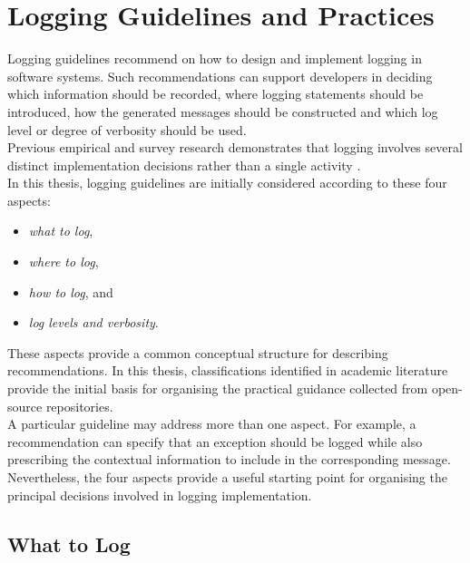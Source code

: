 \section{Logging Guidelines and Practices}
\label{sec:background_logging_guidelines}

Logging guidelines recommend on how to design and implement logging in software systems.
Such recommendations can support developers in deciding which information should be recorded,
where logging statements should be introduced, how the generated messages should be constructed
and which log level or degree of verbosity should be used.
\\
Previous empirical and survey research demonstrates that logging involves several distinct implementation 
decisions rather than a single activity \cite{chen2021asurveyofsoftwareloginstrumentation,gu2023loggingpracticesinsoftwareengineering,fu2014wheredodeveloperslog}.
\\
In this thesis, logging guidelines are initially considered according to these four aspects:

\begin{itemize}
\item \textit{what to log},
\item \textit{where to log},
\item \textit{how to log}, and
\item \textit{log levels and verbosity}.
\end{itemize}

These aspects provide a common conceptual structure for describing recommendations.
In this thesis, classifications identified in academic literature provide the initial basis for organising the practical guidance collected from open-source repositories.
\\
A particular guideline may address more than one aspect. For example, a recommendation 
can specify that an exception should be logged while also prescribing the contextual 
information to include in the corresponding message. Nevertheless, 
the four aspects provide a useful starting point for organising the principal decisions involved in logging implementation.

\subsection{What to Log}
\label{subsec:what_to_log}

